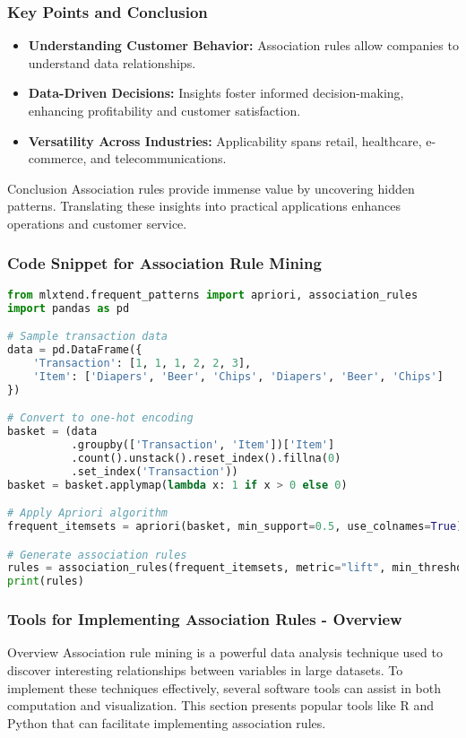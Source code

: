 \documentclass[aspectratio=169]{beamer}
\begin{document}
\begin{frame}[fragile]
    \frametitle{Key Points and Conclusion}
    \begin{itemize}
        \item \textbf{Understanding Customer Behavior:} Association rules allow companies to understand data relationships.
        \item \textbf{Data-Driven Decisions:} Insights foster informed decision-making, enhancing profitability and customer satisfaction.
        \item \textbf{Versatility Across Industries:} Applicability spans retail, healthcare, e-commerce, and telecommunications.
    \end{itemize}
    
    \begin{block}{Conclusion}
        Association rules provide immense value by uncovering hidden patterns. Translating these insights into practical applications enhances operations and customer service.
    \end{block}
\end{frame}

\begin{frame}[fragile]
    \frametitle{Code Snippet for Association Rule Mining}
    \begin{lstlisting}[language=Python]
from mlxtend.frequent_patterns import apriori, association_rules
import pandas as pd

# Sample transaction data
data = pd.DataFrame({
    'Transaction': [1, 1, 1, 2, 2, 3],
    'Item': ['Diapers', 'Beer', 'Chips', 'Diapers', 'Beer', 'Chips']
})

# Convert to one-hot encoding
basket = (data
          .groupby(['Transaction', 'Item'])['Item']
          .count().unstack().reset_index().fillna(0)
          .set_index('Transaction'))
basket = basket.applymap(lambda x: 1 if x > 0 else 0)

# Apply Apriori algorithm
frequent_itemsets = apriori(basket, min_support=0.5, use_colnames=True)

# Generate association rules
rules = association_rules(frequent_itemsets, metric="lift", min_threshold=1)
print(rules)
    \end{lstlisting}
\end{frame}

\begin{frame}[fragile]
    \frametitle{Tools for Implementing Association Rules - Overview}
    \begin{block}{Overview}
        Association rule mining is a powerful data analysis technique used to discover interesting relationships between variables in large datasets. 
        To implement these techniques effectively, several software tools can assist in both computation and visualization. 
        This section presents popular tools like R and Python that can facilitate implementing association rules.
    \end{block}
\end{frame}
\end{document}
